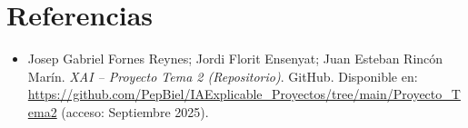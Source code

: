 \section*{Referencias}
\begingroup
\small
\begin{itemize}
  \item Josep Gabriel Fornes Reynes; Jordi Florit Ensenyat; Juan Esteban Rincón Marín.
  \emph{XAI – Proyecto Tema 2 (Repositorio)}. GitHub.
  Disponible en: \url{https://github.com/PepBiel/IAExplicable_Proyectos/tree/main/Proyecto_Tema2}
  (acceso: Septiembre 2025).
\end{itemize}
\endgroup
